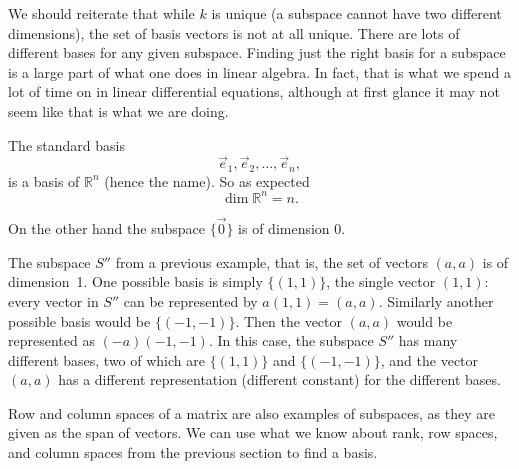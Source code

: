 
We should reiterate that while $k$ is unique (a subspace cannot have two different
dimensions), the set of basis vectors is not at all unique.  There are lots
of different bases for any given subspace.  Finding just the right basis for
a subspace is a large part of what one does in linear algebra.  In fact,
that is what we spend a lot of time on in
linear differential equations, although at first glance
it may not seem like that is what we are doing.

\begin{example}
The standard basis
\begin{equation*}
\vec{e}_1, \vec{e}_2, \ldots, \vec{e}_n ,
\end{equation*}
is a basis of ${\mathbb R}^n$ (hence the name).
So as expected
\begin{equation*}
\dim {\mathbb R}^n = n .
\end{equation*}

On the other hand the subspace $\{ \vec{0} \}$ is of dimension $0$.

The subspace $S''$ from a previous example, that is, the set of
vectors $(a,a)$ is of dimension~1.  One possible basis is simply
$\{ (1,1) \}$, the single
vector $(1,1)$: every vector in $S''$ can be represented by $a (1,1) =
(a,a)$.  Similarly another possible basis would be $\{ (-1,-1) \}$.  Then
the vector $(a,a)$ would be represented as $(-a) (-1,-1)$. In this case, the subspace $S''$ has many different bases, two of which are $\{(1,1)\}$ and $\{(-1,-1)\}$, and the vector $(a,a)$ has a different representation (different constant) for the different bases.
\end{example}

Row and column spaces of a matrix are also examples of
subspaces,
as they are given as the span of vectors.
We can use
what we know about rank, row spaces, and column spaces
from the previous section to find a basis.

